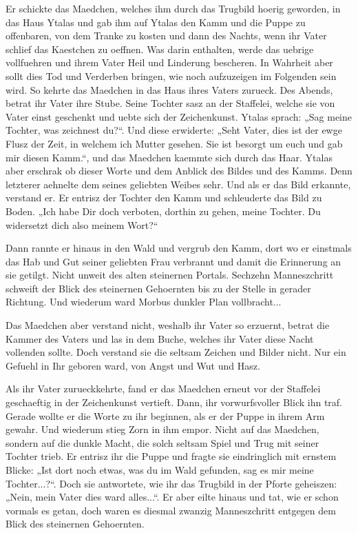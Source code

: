 \documentclass[a5paper,8pt]{book}
\begin{document}
Er schickte das Maedchen, welches ihm durch das Trugbild hoerig geworden, in das Haus Ytalas und gab ihm auf Ytalas den Kamm und die Puppe zu offenbaren, von dem Tranke zu kosten und dann des Nachts, wenn ihr Vater schlief das Kaestchen zu oeffnen. Was darin enthalten, werde das uebrige vollfuehren und ihrem Vater Heil und Linderung bescheren. In Wahrheit aber sollt dies Tod und Verderben bringen, wie noch aufzuzeigen im Folgenden sein wird.
So kehrte das Maedchen in das Haus ihres Vaters zurueck. Des Abends, betrat ihr Vater ihre Stube. Seine Tochter sasz an der Staffelei, welche sie von Vater einst geschenkt und uebte sich der Zeichenkunst. Ytalas sprach: „Sag meine Tochter, was zeichnest du?“. Und diese erwiderte: „Seht Vater, dies ist der ewge Flusz der Zeit, in welchem ich Mutter gesehen. Sie ist besorgt um euch und gab mir diesen Kamm.“, und das Maedchen kaemmte sich durch das Haar. Ytalas aber erschrak ob dieser Worte und dem Anblick des Bildes und des Kamms. Denn letzterer aehnelte dem seines geliebten Weibes sehr. Und als er das Bild erkannte, verstand er. Er entrisz der Tochter den Kamm und schleuderte das Bild zu Boden. „Ich habe Dir doch verboten, dorthin zu gehen, meine Tochter. Du widersetzt dich also meinem Wort?“

Dann rannte er hinaus in den Wald und vergrub den Kamm, dort wo er einstmals das Hab und Gut seiner geliebten Frau verbrannt und damit die Erinnerung an sie getilgt. Nicht unweit des alten steinernen Portals. Sechzehn Manneszchritt schweift der Blick des steinernen Gehoernten bis zu der Stelle in gerader Richtung. Und wiederum ward Morbus dunkler Plan vollbracht...

Das Maedchen aber verstand nicht, weshalb ihr Vater so erzuernt, betrat die Kammer des Vaters und las in dem Buche, welches ihr Vater diese Nacht vollenden sollte. Doch verstand sie die seltsam Zeichen und Bilder nicht. Nur ein Gefuehl in Ihr geboren ward, von Angst und Wut und Hasz.

Als ihr Vater zurueckkehrte, fand er das Maedchen erneut vor der Staffelei geschaeftig in der Zeichenkunst vertieft. Dann, ihr vorwurfsvoller Blick ihn traf. Gerade wollte er die Worte zu ihr beginnen, als er der Puppe in ihrem Arm gewahr. Und wiederum stieg Zorn in ihm empor. Nicht auf das Maedchen, sondern auf die dunkle Macht, die solch seltsam Spiel und Trug mit seiner Tochter trieb. Er entrisz ihr die Puppe und fragte sie eindringlich mit ernstem Blicke: „Ist dort noch etwas, was du im Wald gefunden, sag es mir meine Tochter...?“. Doch sie antwortete, wie ihr das Trugbild in der Pforte geheiszen: „Nein, mein Vater dies ward alles...“. Er aber eilte hinaus und tat, wie er schon vormals es getan, doch waren es diesmal zwanzig Manneszchritt entgegen dem Blick des steinernen Gehoernten.
\end{document}
